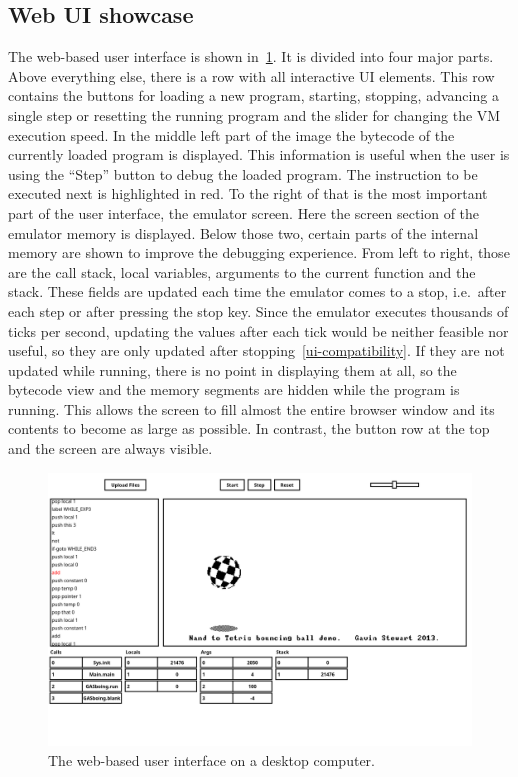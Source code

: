 \subsection{Web UI showcase} \label{ui-showcase}
The web-based user interface is shown in~\cref{fig:ui-demo-desktop}.
It is divided into four major parts.
Above everything else, there is a row with all interactive UI elements.
This row contains the buttons for loading a new program, starting, stopping, advancing a single step or resetting the running program and the slider for changing the VM execution speed.
In the middle left part of the image the bytecode of the currently loaded program is displayed.
This information is useful when the user is using the ``Step'' button to debug the loaded program.
The instruction to be executed next is highlighted in red.
To the right of that is the most important part of the user interface, the emulator screen.
Here the screen section of the emulator memory is displayed.
Below those two, certain parts of the internal memory are shown to improve the debugging experience.
From left to right, those are the call stack, local variables, arguments to the current function and the stack.
These fields are updated each time the emulator comes to a stop, i.e.\ after each step or after pressing the stop key.
Since the emulator executes thousands of ticks per second, updating the values after each tick would be neither feasible nor useful, so they are only updated after stopping~\ref{ui-compatibility}.
If they are not updated while running, there is no point in displaying them at all, so the bytecode view and the memory segments are hidden while the program is running.
This allows the screen to fill almost the entire browser window and its contents to become as large as possible.
In contrast, the button row at the top and the screen are always visible.
\begin{center}
  \begin{figure}[ht]
    \centering
    \includegraphics[width=14cm]{fig/ui-demo-desktop.png}
    \caption{The web-based user interface on a desktop computer.}%
    \label{fig:ui-demo-desktop}
  \end{figure}
\end{center}
